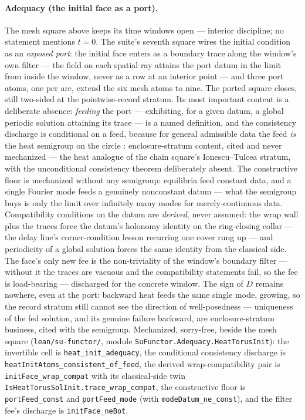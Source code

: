 \paragraph{Adequacy (the initial face as a port).} The mesh square
above keeps its time windows open --- interior discipline; no
statement mentions $t = 0$.  The suite's seventh square wires the
initial condition as an \emph{exposed port}: the initial face
enters as a boundary trace along the window's own filter --- the
field on each spatial ray attains the port datum in the limit from
inside the window, never as a row at an interior point --- and
three port atoms, one per arc, extend the six mesh atoms to nine.
The ported square closes, still two-sided at the pointwise-record
stratum.  Its most important content is a deliberate absence:
\emph{feeding} the port --- exhibiting, for a given datum, a global
periodic solution attaining its trace --- is a named definition,
and the consistency discharge is conditional on a feed, because for
general admissible data the feed \emph{is} the heat semigroup on
the circle \cite{evans-2010}: enclosure-stratum content, cited and
never mechanized
--- the heat analogue of the chain square's Ionescu--Tulcea
stratum, with the unconditional consistency theorem deliberately
absent.  The constructive floor is mechanized without any
semigroup: equilibria feed constant data, and a single Fourier mode
feeds a genuinely nonconstant datum --- what the semigroup buys is
only the limit over infinitely many modes for merely-continuous
data.  Compatibility conditions on the datum are \emph{derived},
never assumed: the wrap wall plus the traces force the datum's
holonomy identity on the ring-closing collar --- the delay line's
corner-condition lesson recurring one cover rung up --- and
periodicity of a global solution forces the same identity from the
classical side.  The face's only new fee is the non-triviality of
the window's boundary filter --- without it the traces are vacuous
and the compatibility statements fail, so the fee is load-bearing
--- discharged for the concrete window.  The sign of $D$
remains nowhere, even at the port: backward heat feeds the same
single mode, growing, so the record stratum still cannot see the
direction of well-posedness --- uniqueness of the fed solution, and
its genuine failure backward, are enclosure-stratum business, cited
with the semigroup.  Mechanized, sorry-free, beside the mesh square
(\texttt{lean/su-functor/}, module
\texttt{SuFunctor.Adequacy.HeatTorusInit}): the invertible cell is
\texttt{heat\_init\_adequacy}, the conditional consistency
discharge is \texttt{heatInitAtoms\_consistent\_of\_feed}, the
derived wrap-compatibility pair is \texttt{initFace\_wrap\_compat}
with its classical-side twin
\texttt{IsHeatTorusSolInit.trace\_wrap\_compat}, the
constructive floor is \texttt{portFeed\_const} and
\texttt{portFeed\_mode} (with \texttt{modeDatum\_ne\_const}), and
the filter fee's discharge is \texttt{initFace\_neBot}.

